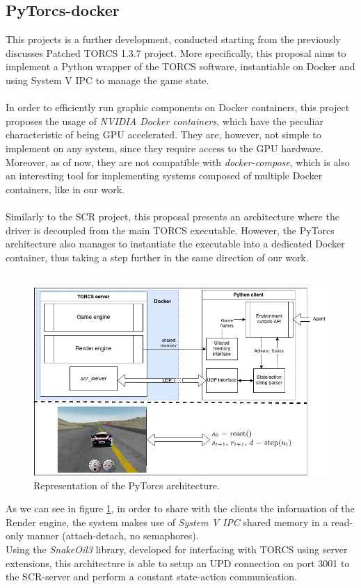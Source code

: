 \subsection{PyTorcs-docker}
This projects is a further development, conducted starting from the previously discusses Patched TORCS 1.3.7 project. More specifically, this proposal aims to implement a Python wrapper of the TORCS software, instantiable on Docker and using System V IPC to manage the game state. \\ \\
In order to efficiently run graphic components on Docker containers, this project proposes the usage of \textit{NVIDIA Docker containers}, which have the peculiar characteristic of being GPU accelerated. They are, however, not simple to implement on any system, since they require access to the GPU hardware. Moreover, as of now, they are not compatible with \textit{docker-compose}, which is also an interesting tool for implementing systems composed of multiple Docker containers, like in our work. \\ \\
Similarly to the SCR project, this proposal presents an architecture where the driver is decoupled from the main TORCS executable. However, the PyTorcs architecture also manages to instantiate the executable into a dedicated Docker container, thus taking a step further in the same direction of our work. \\ \\
\begin{figure}
	\centering
	\includegraphics[width=0.9\linewidth]{"immagini/Software development/PyTorcs architecture"}
	\caption[Representation of the PyTorcs architecture.]{Representation of the PyTorcs architecture.}
	\label{fig:pytorcs-architecture}
\end{figure}
As we can see in figure \ref{fig:pytorcs-architecture}, in order to share with the clients the information of the Render engine, the system makes use of \textit{System V IPC} shared memory in a read-only manner (attach-detach, no semaphores). \\ 
Using the \textit{SnakeOil3} library, developed for interfacing with TORCS using server extensions, this architecture is able to setup an UPD connection on port 3001 to the SCR-server and perform a constant state-action communication.

